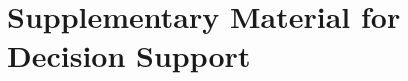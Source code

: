 

\clearpage
\section{Supplementary Material for Decision Support}
\label{Appendix::DecisionSupport}


